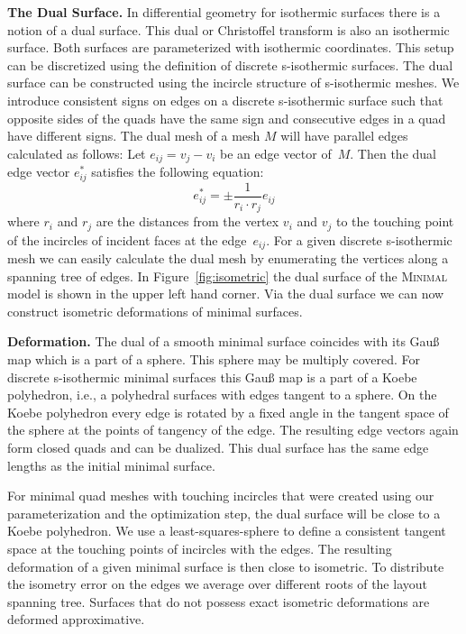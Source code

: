 \documentclass[Thesis.tex]{subfiles}
\begin{document}
\noindent\textbf{The Dual Surface.}
In differential geometry for isothermic surfaces there is a notion of a dual
surface.  This dual or Christoffel transform is also an isothermic surface. Both
surfaces are parameterized with isothermic coordinates. This setup can be
discretized using the definition of discrete s-isothermic surfaces. The dual
surface can be constructed using the incircle structure of s-isothermic meshes.
We introduce consistent signs on edges on a discrete s-isothermic surface such
that opposite sides of the quads have the same sign and consecutive edges in a
quad have different signs. The dual mesh of a mesh $M$ will have parallel edges
calculated as follows: Let $e_{ij}=v_j-v_i$ be an edge vector of~$M$. Then the
dual edge vector $e_{ij}^*$ satisfies the following equation:
\[e_{ij}^* = \pm \frac{1}{r_i \cdot r_j} e_{ij}\]
where $r_i$ and $r_j$ are the distances from the vertex $v_i$ and $v_j$ to the
touching point of the incircles of incident faces at the edge~$e_{ij}$. For a
given
discrete s-isothermic mesh we can easily calculate the dual mesh by enumerating
the vertices along a spanning tree of edges. In Figure~\ref{fig:isometric} the
dual surface of the \textsc{Minimal} model is shown in the upper left hand
corner.  Via the dual surface we can now construct isometric deformations of
minimal surfaces.

\noindent\textbf{Deformation.}
The dual of a smooth minimal surface coincides with its Gau{\ss} map which is a
part of a sphere. This sphere may be multiply covered. For discrete s-isothermic
minimal surfaces this Gau{\ss} map is a part of a Koebe polyhedron, i.e., a
polyhedral surfaces with edges tangent to a sphere. On the Koebe polyhedron
every edge is rotated by a fixed angle in the tangent space of the sphere at the
points of tangency of the edge. The resulting edge vectors again form closed
quads and can be dualized. This dual surface has the same edge lengths as the
initial minimal surface.

For minimal quad meshes with touching incircles that were created using our
parameterization and the optimization step, the dual surface will be close to a
Koebe polyhedron. We use a least-squares-sphere to define a consistent tangent
space at the touching points of incircles with the edges. The resulting
deformation of a given minimal surface is then close to isometric. To distribute
the isometry error on the edges we average over different roots of the layout
spanning tree. Surfaces that do not possess exact isometric deformations are
deformed approximative.
\end{document}
